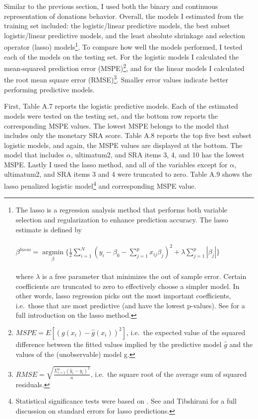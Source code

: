 \documentclass[12pt]{article}
\begin{document}
Similar to the previous section, I used both the binary and continuous representation of donations behavior. Overall, the models I estimated from the training set included: the logistic/linear predictive models, the best subset logistic/linear predictive models, and the least absolute shrinkage and selection operator (lasso) models\footnote{The lasso is a regression analysis method that performs both variable selection and regularization to enhance prediction accuracy. The lasso estimate is defined by\\ \\
\( \beta^{lasso}=\mathop\mathrm{argmin}\limits_{\beta} \{ \frac{1}{2} \sum_{i=1}^{N} (y_{i} - \beta_{0} - \sum_{j=1}^{p}x_{ij}\beta _{j})^{2}+\lambda\sum_{j=1}^{p}|\beta _{j}|\} \) \\ \\
where \(\lambda\) is a free parameter that minimizes the out of sample error. Certain coefficients are truncated to zero to effectively choose a simpler model. In other words, lasso regression picks out the most important coefficients, i.e.\ those that are most predictive (and have the lowest p-values). See \cite{tibshirani_1996} for a full introduction on the lasso method.}. To compare how well the models performed, I tested each of the models on the testing set. For the logistic models I calculated the mean-squared prediction error (MSPE)\footnote{\(MSPE = E[(g(x_{i}) - \hat{g}(x_{i}))^{2}]\), i.e.\ the expected value of the squared difference between the fitted values implied by the predictive model \(\hat{g}\) and the values of the (unobservable) model g.}, and for the linear models I calculated the root mean square error (RMSE)\footnote{\(RMSE = \sqrt{\frac{\Sigma_{i=1}^{n}{(\hat{y}_{i} - y_{i})^2}}{n}}\), i.e.\ the square root of the average sum of squared residuals.}. Smaller error values indicate better performing predictive models.

First, Table A.7 reports the logistic predictive models. Each of the estimated models were tested on the testing set, and the bottom row reports the corresponding MSPE values. The lowest MSPE belongs to the model that includes only the monetary SRA score. Table A.8 reports the top five best subset logistic models, and again, the MSPE values are displayed at the bottom. The model that includes \(\alpha\), ultimatum2, and SRA items 3, 4, and 10 has the lowest MSPE. Lastly I used the lasso method, and all of the variables except for \(\alpha\), ultimatum2, and SRA items 3 and 4 were truncated to zero. Table A.9 shows the lasso penalized logistic model\footnote{Statistical significance tests were based on \cite{lockhart_2014}. See \cite{kyung_2010} and Tibshirani for a full discussion on standard errors for lasso predictions.} and corresponding MSPE value.
\end{document}
